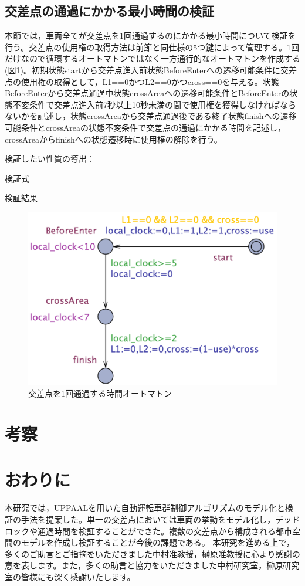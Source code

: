 \documentclass{tpu-sotu}
\begin{document}
	\section{交差点の通過にかかる最小時間の検証}
	本節では，車両全てが交差点を1回通過するのにかかる最小時間について検証を行う。交差点の使用権の取得方法は前節と同仕様の5つ鍵によって管理する。1回だけなので循環するオートマトンではなく一方通行的なオートマトンを作成する(図\ref{minT})。初期状態startから交差点進入前状態BeforeEnterへの遷移可能条件に交差点の使用権の取得として，L1==0かつL2==0かつcross==0を与える。状態BeforeEnterから交差点通過中状態crossAreaへの遷移可能条件とBeforeEnterの状態不変条件で交差点進入前7秒以上10秒未満の間で使用権を獲得しなければならないかを記述し，状態crossAreaから交差点通過後である終了状態finishへの遷移可能条件とcrossAreaの状態不変条件で交差点の通過にかかる時間を記述し，crossAreaからfinishへの状態遷移時に使用権の解除を行う。
	
	検証したい性質の導出：
	
	検証式
	
	検証結果
	\begin{figure}[htbp]
	\centering
	\includegraphics[width=130mm]{minTime.png}
	\caption{交差点を1回通過する時間オートマトン}
	\label{minT}
	\end{figure}
\chapter{考察}

\chapter{おわりに}
本研究では，UPPAALを用いた自動運転車群制御アルゴリズムのモデル化と検証の手法を提案した。単一の交差点においては車両の挙動をモデル化し，デッドロックや通過時間を検証することができた。複数の交差点から構成される都市空間のモデルを作成し検証することが今後の課題である。
\acknowledgements
本研究を進める上で，多くのご助言とご指摘をいただきました中村准教授，榊原准教授に心より感謝の意を表します。また，多くの助言と協力をいただきました中村研究室，榊原研究室の皆様にも深く感謝いたします。
\begin{thebibliography}{1}
\end{thebibliography}
\end{document}
